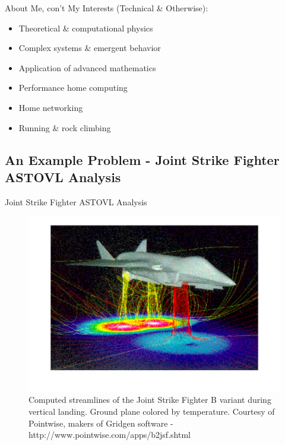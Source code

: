\documentclass{beamer}
\begin{document}
\begin{frame}{About Me, con't}
My Interests (Technical \& Otherwise):
\begin{itemize}
  \item Theoretical \& computational physics
  \item Complex systems \& emergent behavior
  \item Application of advanced mathematics
  \item Performance home computing
  \item Home networking
  \item Running \& rock climbing
\end{itemize}
\end{frame}

\subsection{An Example Problem - Joint Strike Fighter ASTOVL Analysis}

\begin{frame}{Joint Strike Fighter ASTOVL Analysis}
  \begin{figure}
    \includegraphics[width=.7\textwidth]{JSFStreams.pdf}
    \caption{Computed streamlines of the Joint Strike Fighter B variant during vertical landing. Ground plane colored by temperature. Courtesy of Pointwise, makers of Gridgen software - http://www.pointwise.com/apps/b2jsf.shtml}
  \end{figure}
\end{frame}
\end{document}
